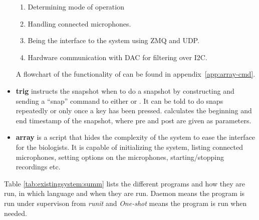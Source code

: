 \begin{itemize}
\begin{enumerate}
		\item Determining mode of operation
		\item Handling connected microphones.
		\item Being the interface to the system using ZMQ and UDP.
		\item Hardware communication with DAC for filtering over I2C.
	\end{enumerate} 
	
	A flowchart of the functionality of  can be found in appendix~\ref{app:array-cmd}. 
	
	\item \textbf{trig} instructs the snapshot when to do a snapshot by constructing and sending a “snap” command to either  or . It can be told to do snaps repeatedly or only once a key has been pressed.  calculates the beginning and end timestamp of the snapshot, where pre and post are given as parameters.
	
	\item \textbf{array} is a script that hides the complexity of the system to ease the interface for the biologists. It is capable of initializing the system, listing connected microphones, setting options on the microphones, starting/stopping recordings etc.

\end{itemize}


Table \ref{tab:existingsystem:summ} lists the different programs and how they are run, in which language and when they are run. Daemon means the program is run under supervison from \textit{runit} and \textit{One-shot} means the program is run when needed.

\begin{table}[H]
\centering
{}
\caption{Table summarizing the software components, what language they are implemented in and how they are run}
\label{tab:existingsystem:summ}
\end{table}


